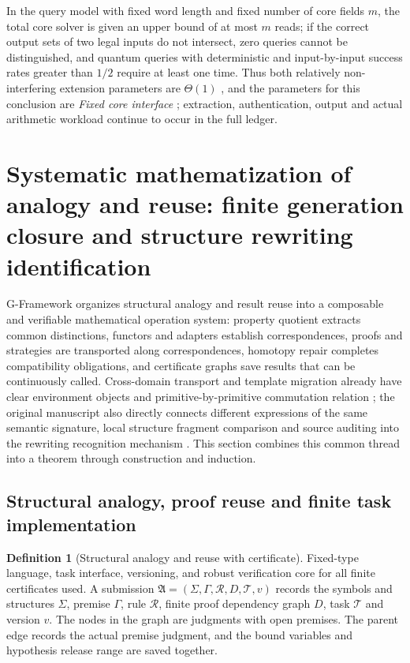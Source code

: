 \documentclass[11pt,a4paper]{article}
\theoremstyle{plain}
\theoremstyle{definition}
\newtheorem{definition}[theorem]{Definition}
\theoremstyle{remark}
\begin{document}
\begin{CJK*}
In the query model with fixed word length and fixed number of core fields $m$, the total core solver is given an upper bound of at most $m$ reads; if the correct output sets of two legal inputs do not intersect, zero queries cannot be distinguished, and quantum queries with deterministic and input-by-input success rates greater than $1/2$ require at least one time. Thus both relatively non-interfering extension parameters are $\Theta(1)$ , and the parameters for this conclusion are \emph { Fixed core interface } ; extraction, authentication, output and actual arithmetic workload continue to occur in the full ledger.

\section { Systematic mathematization of analogy and reuse: finite generation closure and structure rewriting identification }\label{ar:framework}


G-Framework organizes structural analogy and result reuse into a composable and verifiable mathematical operation system: property quotient extracts common distinctions, functors and adapters establish correspondences, proofs and strategies are transported along correspondences, homotopy repair completes compatibility obligations, and certificate graphs save results that can be continuously called. Cross-domain transport and template migration already have clear environment objects and primitive-by-primitive commutation relation \cite{S04,S13,S14}; the original manuscript also directly connects different expressions of the same semantic signature, local structure fragment comparison and source auditing into the rewriting recognition mechanism \cite{S12,S20,S38}. This section combines this common thread into a theorem through construction and induction.

\subsection { Structural analogy, proof reuse and finite task implementation }\label{ar:transport}


\begin{definition}
[Structural analogy and reuse with certificate]Fixed-type language, task interface, versioning, and robust verification core for all finite certificates used. A submission $\mathfrak A=(\Sigma,\Gamma,\mathcal R,D,\mathcal T,v)$ records the symbols and structures $\Sigma$, premise $\Gamma$, rule $\mathcal R$, finite proof dependency graph $D$, task $\mathcal T$ and version $v$. The nodes in the graph are judgments with open premises. The parent edge records the actual premise judgment, and the bound variables and hypothesis release range are saved together.


\end{definition}
\end{CJK*}
\end{document}
